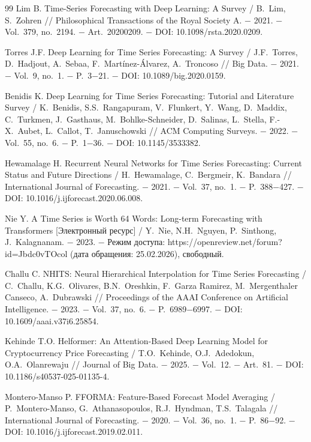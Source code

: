 \documentclass[a4paper,14pt]{extarticle}
\begin{document}
\begin{thebibliography}{99}
 Lim B. Time-Series Forecasting with Deep Learning: A Survey / B.~Lim, S.~Zohren // Philosophical Transactions of the Royal Society A. − 2021. − Vol.~379, no.~2194. − Art.~20200209. − DOI: 10.1098/rsta.2020.0209.

 Torres J.F. Deep Learning for Time Series Forecasting: A Survey / J.F.~Torres, D.~Hadjout, A.~Sebaa, F.~Martínez-Álvarez, A.~Troncoso // Big Data. − 2021. − Vol.~9, no.~1. − P.~3−21. − DOI: 10.1089/big.2020.0159.

 Benidis K. Deep Learning for Time Series Forecasting: Tutorial and Literature Survey / K.~Benidis, S.S.~Rangapuram, V.~Flunkert, Y.~Wang, D.~Maddix, C.~Turkmen, J.~Gasthaus, M.~Bohlke-Schneider, D.~Salinas, L.~Stella, F.-X.~Aubet, L.~Callot, T.~Januschowski // ACM Computing Surveys. − 2022. − Vol.~55, no.~6. − P.~1−36. − DOI: 10.1145/3533382.

 Hewamalage H. Recurrent Neural Networks for Time Series Forecasting: Current Status and Future Directions / H.~Hewamalage, C.~Bergmeir, K.~Bandara // International Journal of Forecasting. − 2021. − Vol.~37, no.~1. − P.~388−427. − DOI: 10.1016/j.ijforecast.2020.06.008.

 Nie Y. A Time Series is Worth 64 Words: Long-term Forecasting with Transformers [Электронный ресурс] / Y.~Nie, N.H.~Nguyen, P.~Sinthong, J.~Kalagnanam. − 2023. − Режим доступа: https://openreview.net/forum?id=Jbdc0vTOcol (дата обращения: 25.02.2026), свободный.

 Challu C. NHITS: Neural Hierarchical Interpolation for Time Series Forecasting / C.~Challu, K.G.~Olivares, B.N.~Oreshkin, F.~Garza Ramirez, M.~Mergenthaler Canseco, A.~Dubrawski // Proceedings of the AAAI Conference on Artificial Intelligence. − 2023. − Vol.~37, no.~6. − P.~6989−6997. − DOI: 10.1609/aaai.v37i6.25854.

 Kehinde T.O. Helformer: An Attention-Based Deep Learning Model for Cryptocurrency Price Forecasting / T.O.~Kehinde, O.J.~Adedokun, O.A.~Olanrewaju // Journal of Big Data. − 2025. − Vol.~12. − Art.~81. − DOI: 10.1186/s40537-025-01135-4.

 Montero-Manso P. FFORMA: Feature-Based Forecast Model Averaging / P.~Montero-Manso, G.~Athanasopoulos, R.J.~Hyndman, T.S.~Talagala // International Journal of Forecasting. − 2020. − Vol.~36, no.~1. − P.~86−92. − DOI: 10.1016/j.ijforecast.2019.02.011.


\end{thebibliography}
\end{document}
